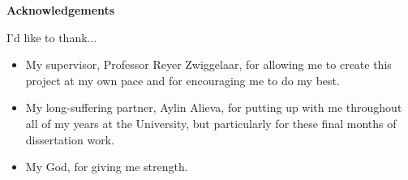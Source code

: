 \thispagestyle{empty}

\begin{center}
    {\LARGE\bf Acknowledgements}
\end{center}

I'd like to thank...
\begin{itemize}
	\item My supervisor, Professor Reyer Zwiggelaar, for allowing me to create this project at my own pace and for encouraging me to do my best.
	\item My long-suffering partner, Aylin Alieva, for putting up with me throughout all of my years at the University, but particularly for these final months of dissertation work. 
	\item My God, for giving me strength.
\end{itemize}

